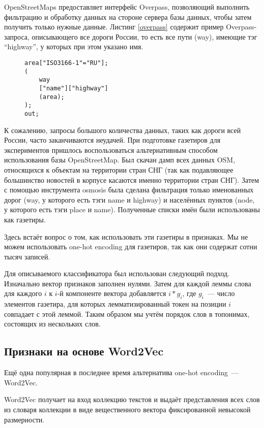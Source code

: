 \documentclass[14pt,russian]{extreport}
\begin{document}
OpenStreetMaps предоставляет интерфейс Overpass, позволяющий выполнить
фильтрацию и обработку данных на стороне сервера базы данных, чтобы затем
получить только нужные данные. Листинг \ref{overpass} содержит пример
Overpass-запроса, описывающего все дороги России, то есть все пути (way),
имеющие тэг ``highway'', у которых при этом указано имя.

\begin{figure}
\begin{lstlisting}[frame=single,caption=Пример Overpass-запроса,label=overpass]
area["ISO3166-1"="RU"];
(
    way
    ["name"]["highway"]
    (area);
);
out;
\end{lstlisting}
\end{figure}

К сожалению, запросы большого количества данных, таких как дороги всей России,
часто заканчиваются неудачей. При подготовке газетиров для экспериментов
пришлось воспользоваться альтернативным способом использования базы
OpenStreetMap. Был скачан дамп всех данных OSM, относящихся к объектам на
территории стран СНГ (так как подавляющее большинство новостей в корпусе
касаются именно территории стран СНГ). Затем с помощью инструмента osmosis была
сделана фильтрация только именованных дорог (way, у которого есть тэги name и highway) и населённых пунктов (node, у которого есть тэги place и name). Полученные
списки имён были использованы как газетиры.

Здесь встаёт вопрос о том, как использовать эти газетиры в признаках. Мы не
можем использовать one-hot encoding для газетиров, так как они содержат
сотни тысяч записей.

Для описываемого классификатора был использован следующий подход.
Изначально вектор признаков заполнен нулями. Затем для каждой леммы слова для
каждого $i$ к $i$-й компоненте вектора добавляется $i*g_i$, где $g_i$~--- число
элементов газетира, для которых лемматизированный токен на позиции $i$
совпадает с этой леммой. Таким образом мы учтём порядок слов в топонимах,
состоящих из нескольких слов.

\subsection{Признаки на основе Word2Vec}

Ещё одна популярная в последнее время альтернатива one-hot encoding~---
Word2Vec\cite{w2v,w2v_expl}.

Word2Vec получает на вход коллекцию текстов и выдаёт представления всех слов из
словаря коллекции в виде вещественного вектора фиксированной невысокой
размерности.
\end{document}
